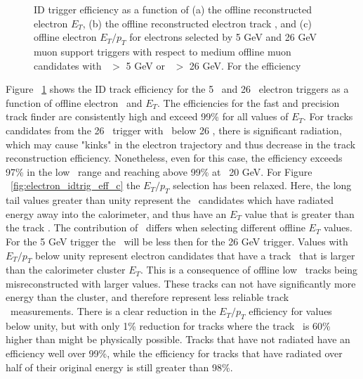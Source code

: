 	\begin{figure}[!htb]
	\begin{center}
		\hspace{0.05\textwidth}
			\hspace{0.05\textwidth}
			\hspace{0.05\textwidth}
	\end{center}	
	\caption{\ac{ID} trigger efficiency as a function of (a) the offline reconstructed electron $E_T$, (b) the offline reconstructed electron track \pt, and (c) offline electron $E_T/p_T$ for electrons selected by 5 GeV and 26 GeV muon support triggers with respect to medium offline muon candidates with \pt\ $>$ 5 GeV or \pt\ $>$ 26 GeV. For the efficiency }
	\label{fig:electron_idtrig_eff}
	\end{figure}	
	Figure ~\ref{fig:electron_idtrig_eff} shows the \ac{ID} track efficiency for the 5 \gev\ and 26 \gev\ electron triggers as a function of offline electron \pt\ and $E_T$. The efficiencies for the fast and precision track finder are consistently high and exceed 99\% for all values of $E_T$. For tracks candidates from the 26 \gev\ trigger with \pt\ below 26 \gev, there is significant radiation, which may cause "kinks"  in the electron trajectory and thus decrease in the track reconstruction efficiency. Nonetheless, even for this case, the efficiency exceeds 97\%  in the low \pt\ range and reaching above 99\% at ~20 GeV.
	 For Figure ~\ref{fig:electron_idtrig_eff_c} the $E_T/p_T$ selection has been relaxed. Here, the long tail values greater than unity represent the \brem\ candidates which have radiated energy away into the calorimeter, and thus have an $E_T$ value that is greater than the track \pt. 
	 The contribution of \brem\ differs when selecting different offline $E_T$ values. For the 5 GeV trigger the \brem\ will be less then for the 26 GeV trigger. 
	Values with $E_T/p_T$ below unity represent electron candidates that have a track \pt\ that is larger than the calorimeter cluster $E_T$. This is a consequence of offline low \pt\ tracks being misreconstructed with larger values. These tracks can not have significantly more energy than the cluster, and therefore represent less reliable track \pt\ measurements. 
	There is a clear reduction in the $E_T/p_T$  efficiency for values below unity, but with only 1\% reduction for tracks where the track \pt\ is 60\% higher than might be physically possible. Tracks that have not radiated have an efficiency well over 99\%, while the efficiency for tracks that have radiated over half of their original energy is still greater than 98\%.
	
